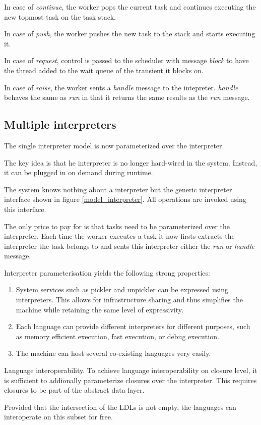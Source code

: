 In case of {\em continue}, the worker
pops the current task and  continues executing the
new topmost task on the task stack.

In case of {\em push}, the worker
pushes the new task to the stack and starts executing it.

In case of {\em request}, control is passed to the scheduler with message
{\em block} to have the thread added to the wait queue of the transient
it blocks on.

In case of {\em raise}, the worker sents a {\em handle} message
to the intepreter. {\em handle} behaves the same as {\em run}
in that it returns the same results as the {\em run} message.
\subsection{Multiple interpreters}
The single interpreter model is now parameterized over the interpreter.

The key idea is that he interpreter
is no longer hard-wired in the system.
Instead, it can be plugged in on demand during runtime.

The system knows nothing about a interpreter but the generic
interpreter interface shown in figure \ref{model_interpreter}.
All operations are invoked using this interface.

The only price to pay for is that tasks need to be parameterized over
the interpreter. Each time the worker executes a task
it now firsts extracts the interpreter the task belongs to and
sents this interpreter either the {\em run} or {\em handle} message.

Interpreter parameterisation yields the following strong properties:
\begin{enumerate}
\item
System services such as pickler and unpickler can be expressed using
interpreters. This allows for infrastructure sharing and thus simplifies
the machine while retaining the same level of expressivity.
\item
Each language can provide different interpreters for different purposes,
such as memory efficient execution, fast execution, or debug execution.
\item
The machine can host several co-existing languages very easily.
\end{enumerate}
\begin{paragraph}{Language interoperability.}
To achieve language interoperability on closure level, it is sufficient
to addionally parameterize closures over the interpreter. This
requires closures to be part of the abstract data layer.

Provided that the intersection of the LDLs is not empty, the languages
can interoperate on this subset for free.
\end{paragraph}
